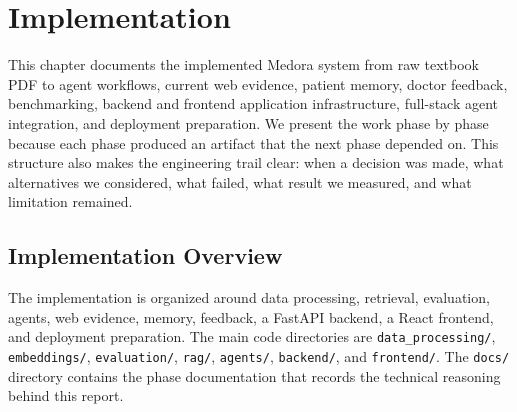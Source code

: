 
\chapter{Implementation}
\label{chapter:Implementation}

This chapter documents the implemented Medora system from raw textbook PDF to agent workflows, current web evidence, patient memory, doctor feedback, benchmarking, backend and frontend application infrastructure, full-stack agent integration, and deployment preparation. We present the work phase by phase because each phase produced an artifact that the next phase depended on. This structure also makes the engineering trail clear: when a decision was made, what alternatives we considered, what failed, what result we measured, and what limitation remained.

\section{Implementation Overview}

The implementation is organized around data processing, retrieval, evaluation, agents, web evidence, memory, feedback, a FastAPI backend, a React frontend, and deployment preparation. The main code directories are \texttt{data\_processing/}, \texttt{embeddings/}, \texttt{evaluation/}, \texttt{rag/}, \texttt{agents/}, \texttt{backend/}, and \texttt{frontend/}. The \texttt{docs/} directory contains the phase documentation that records the technical reasoning behind this report.

